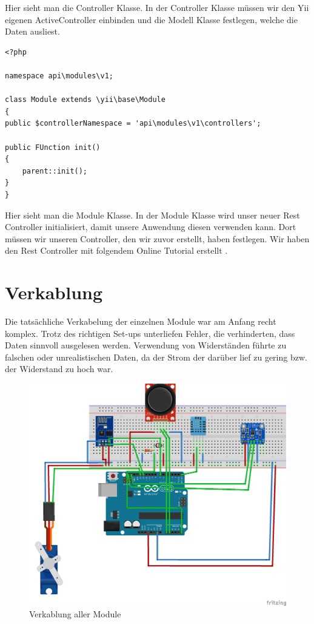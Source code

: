 Hier sieht man die Controller Klasse. In der Controller Klasse müssen wir den Yii eigenen ActiveController einbinden und die Modell Klasse festlegen, welche die Daten ausliest.
\begin{lstlisting}[caption=Module Klasse für REST]
<?php

namespace api\modules\v1;

class Module extends \yii\base\Module
{
public $controllerNamespace = 'api\modules\v1\controllers';

public FUnction init()
{
	parent::init();
}
}
\end{lstlisting}                                                                                                                      
Hier sieht man die Module Klasse. In der Module Klasse wird unser neuer Rest Controller initialisiert, damit unsere Anwendung diesen verwenden kann. Dort müssen wir unseren Controller, den wir zuvor erstellt, haben festlegen.
\newline
Wir haben den Rest Controller mit folgendem Online Tutorial erstellt \cite{Restt}.



\newpage

\def \currentAuthor {Kevin Glatz}
\section{Verkablung}

Die tatsächliche Verkabelung der einzelnen Module war am Anfang recht komplex. Trotz des richtigen Set-ups unterliefen Fehler, die verhinderten, dass Daten sinnvoll ausgelesen werden. Verwendung von Widerständen führte zu falschen oder unrealistischen Daten, da der Strom der darüber lief zu gering bzw. der Widerstand zu hoch war. 

\begin{figure}[h]
	\centering
	\includegraphics[width=0.7\linewidth]{figures/allMod}
	\caption{Verkablung aller Module}
	\label{fig:allmod}
\end{figure}

